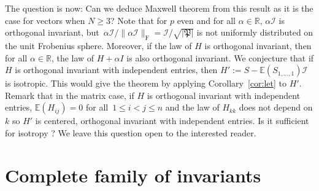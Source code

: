 \documentclass[pdftex]{sigma}
\numberwithin{equation}{section}
\theoremstyle{definition}
\begin{document}
The question is now: Can we deduce Maxwell theorem from this result as it is the case for vectors when $N\geq 3$? Note that for $p$ even and for all $\alpha\in\mathbb{R}$, $\alpha \mathcal{I}$ is orthogonal invariant, but~${\alpha \mathcal{I}/\|\alpha \mathcal{I}\|_{\mathrm{F}}=\mathcal{I}/\sqrt{\vert \mathfrak{P}\vert}}$ is not uniformly distributed on the unit Frobenius sphere. Moreover, if the law of $H$ is orthogonal invariant, then for all $\alpha\in\mathbb{R}$, the law of $H+\alpha I$ is also orthogonal invariant. We conjecture that if $H$ is orthogonal invariant with independent entries, then $H':=S-\mathbb{E}(S_{1,\dots,1}) \mathcal{I}$ is isotropic. This would give the theorem by applying Corollary~\ref{cor:let} to $H'$. Remark that in the matrix case, if $H$ is orthogonal invariant with independent entries, $\mathbb{E}(H_{ij})=0$ for all~${1\leq i<j\leq n}$ and the law of $H_{kk}$ does not depend on $k$ so $H'$ is centered, orthogonal invariant with independent entries. Is it sufficient for isotropy ? We leave this question open to the interested reader.

\section{Complete family of invariants}\label{basis}
\end{document}
